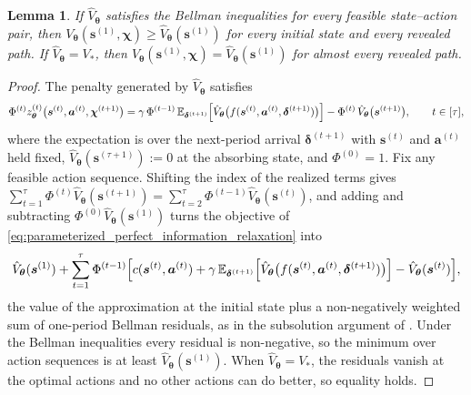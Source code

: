 \documentclass[11pt]{article}
\newtheorem{lemma}{Lemma}
\theoremstyle{definition}
\begin{document}
\begin{lemma}
\label{lem:slack}
If \(\hat V_{\boldsymbol{\theta}}\) satisfies the Bellman inequalities for every feasible state--action pair, then \(V_{\boldsymbol{\theta}}(\boldsymbol{s}^{(1)},\boldsymbol{\chi})\ge\hat V_{\boldsymbol{\theta}}(\boldsymbol{s}^{(1)})\) for every initial state and every revealed path. If \(\hat V_{\boldsymbol{\theta}}=V_*\), then \(V_{\boldsymbol{\theta}}(\boldsymbol{s}^{(1)},\boldsymbol{\chi})=\hat V_{\boldsymbol{\theta}}(\boldsymbol{s}^{(1)})\) for almost every revealed path.
\end{lemma}
\begin{proof}
The penalty generated by \(\hat V_{\boldsymbol{\theta}}\) satisfies
\[
\Phi^{(t)}z^{(t)}_{\boldsymbol{\theta}}\bigl(\boldsymbol{s}^{(t)},\boldsymbol{a}^{(t)},\boldsymbol{\chi}^{(t+1)}\bigr)
=\gamma\,\Phi^{(t-1)}\,\mathbb E_{\boldsymbol{\delta}^{(t+1)}}\Bigl[\hat V_{\boldsymbol{\theta}}\bigl(f(\boldsymbol{s}^{(t)},\boldsymbol{a}^{(t)},\boldsymbol{\delta}^{(t+1)})\bigr)\Bigr]
-\Phi^{(t)}\,\hat V_{\boldsymbol{\theta}}\bigl(\boldsymbol{s}^{(t+1)}\bigr),
\qquad t\in[\tau],
\]
where the expectation is over the next-period arrival \(\boldsymbol{\delta}^{(t+1)}\) with \(\boldsymbol{s}^{(t)}\) and \(\boldsymbol{a}^{(t)}\) held fixed, \(\hat V_{\boldsymbol{\theta}}(\boldsymbol{s}^{(\tau+1)}):=0\) at the absorbing state, and \(\Phi^{(0)}=1\). Fix any feasible action sequence. Shifting the index of the realized terms gives \(\sum_{t=1}^{\tau}\Phi^{(t)}\hat V_{\boldsymbol{\theta}}(\boldsymbol{s}^{(t+1)})=\sum_{t=2}^{\tau}\Phi^{(t-1)}\hat V_{\boldsymbol{\theta}}(\boldsymbol{s}^{(t)})\), and adding and subtracting \(\Phi^{(0)}\hat V_{\boldsymbol{\theta}}(\boldsymbol{s}^{(1)})\) turns the objective of \eqref{eq:parameterized_perfect_information_relaxation} into
\[
\hat V_{\boldsymbol{\theta}}(\boldsymbol{s}^{(1)})+\sum_{t=1}^{\tau}\Phi^{(t-1)}\Bigl[c(\boldsymbol{s}^{(t)},\boldsymbol{a}^{(t)})+\gamma\,\mathbb E_{\boldsymbol{\delta}^{(t+1)}}\Bigl[\hat V_{\boldsymbol{\theta}}\bigl(f(\boldsymbol{s}^{(t)},\boldsymbol{a}^{(t)},\boldsymbol{\delta}^{(t+1)})\bigr)\Bigr]-\hat V_{\boldsymbol{\theta}}(\boldsymbol{s}^{(t)})\Bigr],
\]
the value of the approximation at the initial state plus a non-negatively weighted sum of one-period Bellman residuals, as in the subsolution argument of \citet[Proposition~4.1]{Brown2017or}. Under the Bellman inequalities every residual is non-negative, so the minimum over action sequences is at least \(\hat V_{\boldsymbol{\theta}}(\boldsymbol{s}^{(1)})\). When \(\hat V_{\boldsymbol{\theta}}=V_*\), the residuals vanish at the optimal actions and no other actions can do better, so equality holds.
\end{proof}
\end{document}
